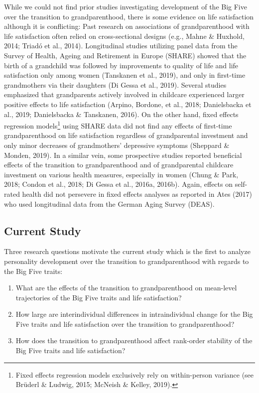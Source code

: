 \documentclass[
  english,
  man, noextraspace]{apa7}
\providecommand{\tightlist}{%
  \setlength{\itemsep}{0pt}\setlength{\parskip}{0pt}}
\begin{document}
While we could not find prior studies investigating development of the Big Five over the transition to grandparenthood, there is some evidence on life satisfaction although it is conflicting: Past research on associations of grandparenthood with life satisfaction often relied on cross-sectional designs (e.g., Mahne \& Huxhold, 2014; Triadó et al., 2014). Longitudinal studies utilizing panel data from the Survey of Health, Ageing and Retirement in Europe (SHARE) showed that the birth of a grandchild was followed by improvements to quality of life and life satisfaction only among women (Tanskanen et al., 2019), and only in first-time grandmothers via their daughters (Di Gessa et al., 2019). Several studies emphasized that grandparents actively involved in childcare experienced larger positive effects to life satisfaction (Arpino, Bordone, et al., 2018; Danielsbacka et al., 2019; Danielsbacka \& Tanskanen, 2016). On the other hand, fixed effects regression models\footnote{Fixed effects regression models exclusively rely on within-person variance (see Brüderl \& Ludwig, 2015; McNeish \& Kelley, 2019).} using SHARE data did not find any effects of first-time grandparenthood on life satisfaction regardless of grandparental investment and only minor decreases of grandmothers' depressive symptoms (Sheppard \& Monden, 2019).
In a similar vein, some prospective studies reported beneficial effects of the transition to grandparenthood and of grandparental childcare investment on various health measures, especially in women (Chung \& Park, 2018; Condon et al., 2018; Di Gessa et al., 2016a, 2016b). Again, effects on self-rated health did not persevere in fixed effects analyses as reported in Ates (2017) who used longitudinal data from the German Aging Survey (DEAS).

\hypertarget{current-study}{%
\subsection{Current Study}\label{current-study}}

Three research questions motivate the current study which is the first to analyze personality development over the transition to grandparenthood with regards to the Big Five traits:

\begin{enumerate}
\def\labelenumi{\arabic{enumi}.}
\tightlist
\item
  What are the effects of the transition to grandparenthood on mean-level trajectories of the Big Five traits and life satisfaction?
\item
  How large are interindividual differences in intraindividual change for the Big Five traits and life satisfaction over the transition to grandparenthood?
\item
  How does the transition to grandparenthood affect rank-order stability of the Big Five traits and life satisfaction?
\end{enumerate}
\end{document}
